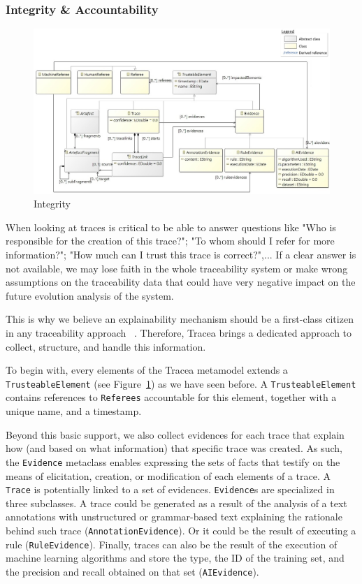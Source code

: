\subsubsection{Integrity \& Accountability}\label{sec:integrity}
\begin{figure}[h]
	\centering
	\includegraphics[width=.99\linewidth]{images/integrity.jpg}
	\caption{Integrity}
	\label{fig:mm-integrity}
\end{figure}

When looking at traces is critical to be able to answer questions like "Who is responsible for the creation of this trace?"; "To whom should I refer for more information?"; "How much can I trust this trace is correct?",... If a clear answer is not available, we may lose faith in the whole traceability system or make wrong assumptions on the traceability data that could have very negative impact on the future evolution analysis of the system. 

This is why we believe an explainability mechanism should be a first-class citizen in any traceability approach ~\cite{gotel1995-contribution-structures-req-eng}. Therefore, Tracea brings a dedicated approach to collect, structure, and handle this information.

To begin with, every elements of the Tracea metamodel extends a \texttt{TrusteableElement} (see Figure~\ref{fig:mm-integrity}) as we have seen before. A \texttt{TrusteableElement} contains references to \texttt{Referees} accountable for this element, together with a unique name, and a timestamp.

Beyond this basic support, we also collect evidences for each trace that explain how (and based on what information) that specific trace was created. As such, the \texttt{Evidence} metaclass enables expressing the sets of facts that testify on the means of elicitation, creation, or modification of each elements of a trace. A \texttt{Trace} is potentially linked to a set of evidences. \texttt{Evidence}s are specialized in three subclasses. A trace could be generated as a result of the analysis of a  text annotations with unstructured or grammar-based text explaining the rationale behind such trace (\texttt{AnnotationEvidence}). Or it could be the result of executing a rule (\texttt{RuleEvidence}). Finally, traces can also be the result of the execution of machine learning algorithms and store the type, the ID of the training set, and the precision and recall obtained on that set (\texttt{AIEvidence}).

